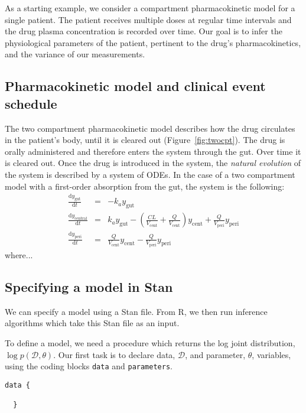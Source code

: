 
As a starting example, we consider a compartment pharmacokinetic model for a single patient.
The patient receives multiple doses at regular time intervals and the drug plasma concentration is recorded over time.
Our goal is to infer the physiological parameters of the patient, pertinent to the drug's pharmacokinetics, and the variance of our measurements.

\subsection{Pharmacokinetic model and clinical event schedule} 

The two compartment pharmacokinetic model describes how the drug circulates in the patient's body, until it is cleared out (Figure~\ref{fig:twocpt}).
The drug is orally administered and therefore enters the system through the gut.
Over time it is cleared out.
Once the drug is introduced in the system, the \textit{natural evolution} of the system is described by a system of ODEs.
In the case of a two compartment model with a first-order absorption from the gut, the system is the following:
%
\begin{eqnarray*}
  \frac{\mathrm d y_\mathrm{gut}}{\mathrm d t} & = & - k_a y_\mathrm{gut} \\ 
  \frac{\mathrm d y_\mathrm{central}}{\mathrm d t} & = & k_a y_\mathrm{gut} - \left (\frac{CL}{V_\mathrm{cent}} + \frac{Q}{V_\mathrm{cent}} \right) y_\mathrm{cent} + \frac{Q}{V_\mathrm{peri}} y_\mathrm{peri} \\
  \frac{\mathrm d y_\mathrm{peri}}{\mathrm d t} & = & \frac{Q}{V_\mathrm{cent}} y_\mathrm{cent} - \frac{Q}{V_\mathrm{peri}} y_\mathrm{peri}
\end{eqnarray*}
%
where...


\subsection{Specifying a model in Stan}

We can specify a model using a Stan file.
From R, we then run inference algorithms which take this Stan file as an input.

To define a model, we need a procedure which returns the log joint distribution, $\log p(\mathcal D, \theta)$.
Our first task is to declare data, $\mathcal D$, and parameter, $\theta$, variables, using the coding blocks \texttt{data} and \texttt{parameters}.

\begin{lstlisting}[style=stan, numbers=none] 
  data {
  
  }
 
\end{lstlisting}
